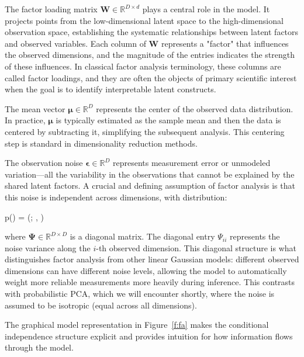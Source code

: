 The factor loading matrix $\mathbf{W} \in \mathbb{R}^{D \times d}$ plays a central role in the model. It projects points from the low-dimensional latent space to the high-dimensional observation space, establishing the systematic relationships between latent factors and observed variables. Each column of $\mathbf{W}$ represents a "factor" that influences the observed dimensions, and the magnitude of the entries indicates the strength of these influences. In classical factor analysis terminology, these columns are called factor loadings, and they are often the objects of primary scientific interest when the goal is to identify interpretable latent constructs.

The mean vector $\boldsymbol{\mu} \in \mathbb{R}^D$ represents the center of the observed data distribution. In practice, $\boldsymbol{\mu}$ is typically estimated as the sample mean and then the data is centered by subtracting it, simplifying the subsequent analysis. This centering step is standard in dimensionality reduction methods.

The observation noise $\boldsymbol{\epsilon} \in \mathbb{R}^D$ represents measurement error or unmodeled variation—all the variability in the observations that cannot be explained by the shared latent factors. A crucial and defining assumption of factor analysis is that this noise is independent across dimensions, with distribution:
\begin{myequation}
p(\boldsymbol{\epsilon}) = (\boldsymbol{\epsilon}; , \boldsymbol{\Psi})
\end{myequation}

where $\boldsymbol{\Psi} \in \mathbb{R}^{D \times D}$ is a diagonal matrix. The diagonal entry $\Psi_{ii}$ represents the noise variance along the $i$-th observed dimension. This diagonal structure is what distinguishes factor analysis from other linear Gaussian models: different observed dimensions can have different noise levels, allowing the model to automatically weight more reliable measurements more heavily during inference. This contrasts with probabilistic PCA, which we will encounter shortly, where the noise is assumed to be isotropic (equal across all dimensions).

The graphical model representation in Figure~\ref{f:fa} makes the conditional independence structure explicit and provides intuition for how information flows through the model.

